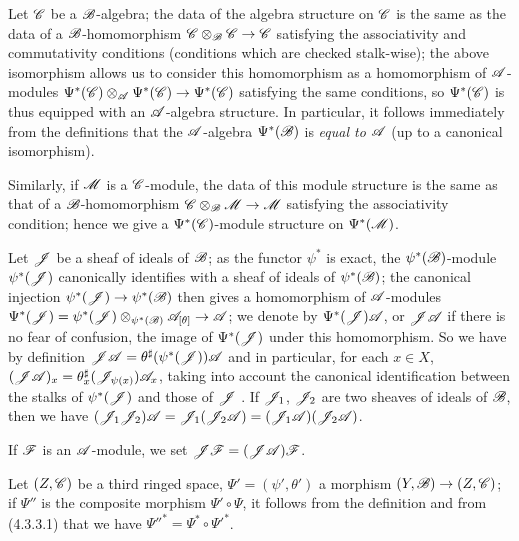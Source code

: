 \begin{env}[4.3.4]
\label{0.4.3.4}
Let $\mathscr{C}$ be a $\mathscr{B}$-algebra; the data of the algebra structure on
$\mathscr{C}$ is the same as the data of a $\mathscr{B}$-homomorphism
$\mathscr{C}\otimes_\mathscr{B}\mathscr{C}\to\mathscr{C}$ satisfying the associativity and
commutativity conditions (conditions which are checked stalk-wise); the above
isomorphism allows us to consider this homomorphism as a homomorphism of
$\mathscr{A}$-modules $\Psi^*(\mathscr{C})\otimes_\mathscr{A}\Psi^*(\mathscr{C})\to\Psi^*(\mathscr{C})$
satisfying the same conditions, so $\Psi^*(\mathscr{C})$ is thus equipped with an
$\mathscr{A}$-algebra structure. In particular, it follows immediately from the
definitions that the $\mathscr{A}$-algebra $\Psi^*(\mathscr{B})$ is \emph{equal to
$\mathscr{A}$} (up to a canonical isomorphism).

Similarly, if $\mathscr{M}$ is a $\mathscr{C}$-module, the data of this module structure
is the same
as that of a $\mathscr{B}$-homomorphism $\mathscr{C}\otimes_\mathscr{B}\mathscr{M}\to\mathscr{M}$
satisfying the associativity condition; hence we give a $\Psi^*(\mathscr{C})$-module
structure on $\Psi^*(\mathscr{M})$.
\end{env}

\begin{env}[4.3.5]
\label{0.4.3.5}
Let $\mathscr{J}$ be a sheaf of ideals of $\mathscr{B}$; as the functor $\psi^*$ is exact,
the $\psi^*(\mathscr{B})$-module $\psi^*(\mathscr{J})$ canonically identifies with a sheaf
of ideals of $\psi^*(\mathscr{B})$; the canonical injection
$\psi^*(\mathscr{J})\to\psi^*(\mathscr{B})$ then gives a homomorphism of $\mathscr{A}$-modules
$\Psi^*(\mathscr{J})=\psi^*(\mathscr{J})\otimes_{\psi^*(\mathscr{B})}\mathscr{A}_{[\theta]}
  \to\mathscr{A}$; we denote by $\Psi^*(\mathscr{J})\mathscr{A}$, or $\mathscr{J}\mathscr{A}$ if there is
no fear of confusion, the image of $\Psi^*(\mathscr{J})$ under this homomorphism. So
we have by definition $\mathscr{J}\mathscr{A}=\theta^\sharp(\psi^*(\mathscr{J}))\mathscr{A}$ and in
particular, for each $x\in X$,
$(\mathscr{J}\mathscr{A})_x=\theta_x^\sharp(\mathscr{J}_{\psi(x)})\mathscr{A}_x$, taking into
account the canonical identification between the stalks of $\psi^*(\mathscr{J})$ and
those of $\mathscr{J}$ . If $\mathscr{J}_1$, $\mathscr{J}_2$ are two sheaves
of ideals of $\mathscr{B}$, then we have
$(\mathscr{J}_1\mathscr{J}_2)\mathscr{A}
  =\mathscr{J}_1(\mathscr{J}_2\mathscr{A})=(\mathscr{J}_1\mathscr{A})(\mathscr{J}_2\mathscr{A})$.

If $\mathscr{F}$ is an $\mathscr{A}$-module, we set $\mathscr{J}\mathscr{F}=(\mathscr{J}\mathscr{A})\mathscr{F}$.
\end{env}

\begin{env}[4.3.6]
\label{0.4.3.6}
Let $(Z,\mathscr{C})$ be a third ringed space, $\Psi'=(\psi',\theta')$ a morphism
$(Y,\mathscr{B})\to(Z,\mathscr{C})$; if $\Psi''$ is the composite morphism
$\Psi'\circ\Psi$, it follows from the definition  and from
(4.3.3.1) that we have ${\Psi''}^*=\Psi^*\circ{\Psi'}^*$.
\end{env}

